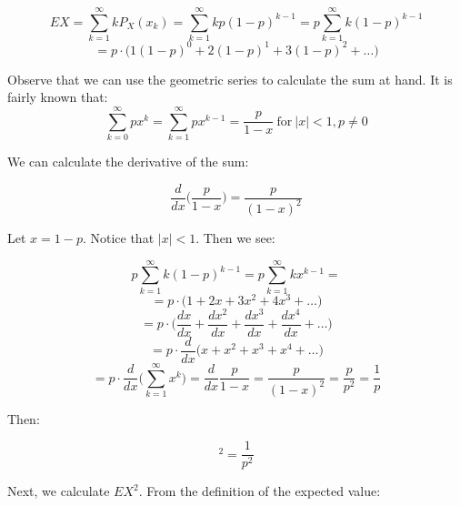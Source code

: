 \documentclass{article}
\begin{document}
\begin{equation*}
    EX = \sum_{k = 1}^{\infty}kP_{X}(x_k) = \sum_{k = 1}^{\infty} kp(1 - p)^{k-1} = p \sum_{k = 1}^{\infty} k(1 - p)^{k-1}
\end{equation*}
\begin{equation*}
    = p \cdot \Big( 1(1 - p)^{0} + 2(1 - p)^{1} + 3(1 - p)^{2} + \dots \Big)
\end{equation*}

Observe that we can use the geometric series to calculate the sum at hand. It is fairly known that:
\begin{equation*}
    \sum_{k=0}^{\infty}px^{k} = \sum_{k=1}^{\infty}px^{k-1}  = \frac{p}{1 - x} \ \mbox{for} \ |x| < 1, p \neq 0
\end{equation*}


We can calculate the derivative of the sum:

\begin{equation*}
    \frac{d}{dx}\Big(\frac{p}{1 - x}\Big) = \frac{p}{(1 - x)^{2}}
\end{equation*}

Let \(x = 1 - p\). Notice that \(|x| < 1\). Then we see:


\begin{equation*}
    p \sum_{k = 1}^{\infty} k(1 - p)^{k-1} = p \sum_{k = 1}^{\infty} kx^{k-1} = 
\end{equation*}
\begin{equation*}
    = p \cdot \Big( 1 + 2x + 3x^{2} + 4x^{3} + \dots \Big) 
\end{equation*}
\begin{equation*}
    = p \cdot \Big( \frac{dx}{dx} + \frac{dx^{2}}{dx} + \frac{dx^{3}}{dx} + \frac{dx^{4}}{dx} + \dots \Big)
\end{equation*}
\begin{equation*}
    = p \cdot \frac{d}{dx}\Big( x + x^{2} + x^{3} + x^{4} + \dots  \Big)
\end{equation*}
\begin{equation*}
    = p \cdot \frac{d}{dx}\Big( \sum_{k=1}^{\infty} x^{k}  \Big) = \frac{d}{dx} \frac{p}{1-x} = \frac{p}{(1 - x)^{2}} = \frac{p}{p^{2}} = \frac{1}{p}
\end{equation*}

Then:

\begin{equation*}
    [EX]^{2} = \frac{1}{p^{2}}
\end{equation*}

Next, we calculate \(EX^{2}\). From the definition of the expected value:
\end{document}

